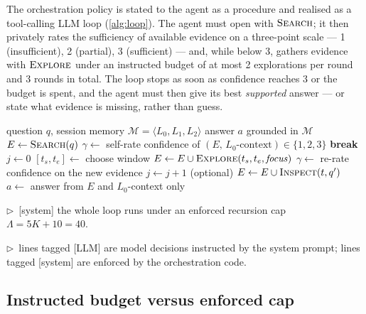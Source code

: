 The orchestration policy is stated to the agent as a procedure and realised as a tool-calling LLM
loop (\cref{alg:loop}). The agent must open with $\textsc{Search}$; it then privately rates the
sufficiency of available evidence on a three-point scale --- 1 (insufficient), 2 (partial), 3
(sufficient) --- and, while below 3, gathers evidence with $\textsc{Explore}$ under an instructed
budget of at most 2 explorations per round and 3 rounds in total. The loop stops as soon as
confidence reaches 3 or the budget is spent, and the agent must then give its best \emph{supported}
answer --- or state what evidence is missing, rather than guess.

\begin{algorithm}[t]
\caption{Confidence-driven answering (one question).}
\label{alg:loop}
\begin{algorithmic}[1]
\Require question $q$, session memory $\mathcal{M} = \langle L_0, L_1, L_2 \rangle$
\Ensure answer $a$ grounded in $\mathcal{M}$
\State $E \gets \textsc{Search}(q)$ 
 
    \State $\gamma \gets$ self-rate confidence of $(E,\, L_0\text{-context}) \in \{1, 2, 3\}$ \Comment{[LLM]}
     \State \textbf{break} \EndIf
    \State $j \gets 0$
     
        \State $[t_s, t_e] \gets$ choose window 
        \State $E \gets E \cup \textsc{Explore}(t_s, t_e, \mathit{focus})$ 
        \State $\gamma \gets$ re-rate confidence on the new evidence \Comment{[LLM]}
        \State $j \gets j + 1$
    \EndWhile
    \State (optional) $E \gets E \cup \textsc{Inspect}(t, q')$ 
\EndFor
\State $a \gets$ answer from $E$ and $L_0$-context only 
\end{algorithmic}
\vspace{3pt}
{\footnotesize
$\triangleright$~[system] the whole loop runs under an enforced recursion cap $\Lambda = 5K+10 = 40$.\par
$\triangleright$~lines tagged [LLM] are model decisions instructed by the system prompt;
lines tagged [system] are enforced by the orchestration code.\par}
\end{algorithm}

\subsection{Instructed budget versus enforced cap}
\label{subsec:budget}

